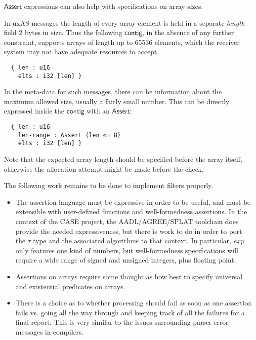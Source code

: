 \documentclass[svgnames]{llncs}
\newcommand{\konst}[1]{\ensuremath{\mathsf{#1}}}
\begin{document}
\noindent \konst{Assert} expressions can also help with specifications
on array sizes.

\begin{example}

In uxAS messages the length of every array element is held in a
separate \emph{length} field 2 bytes in size. Thus the following
\konst{contig}, in the absence of any further constraint, supports arrays of
length up to 65536 elements, which the receiver system may not have
adequate resources to accept.

\begin{verbatim}
  { len : u16
    elts : i32 [len] }
\end{verbatim}

\noindent In the meta-data for such messages, there can be information
about the maximum allowed size, usually a fairly small number. This
can be directly expressed inside the \konst{contig} with an \konst{Assert}:

\begin{verbatim}
  { len : u16
    len-range : Assert (len <= 8)
    elts : i32 [len] }
\end{verbatim}

\noindent Note that the expected array length should be specified
before the array itself, otherwise the allocation attempt might be
made before the check.
\end{example}


\noindent The following work remains to be done to implement filters
properly.

\begin{itemize}

\item The assertion language must be expressive in order to be useful,
  and must be extensible with user-defined functions and
  well-formedness assertions. In the context of the CASE project, the
  AADL/AGREE/SPLAT toolchain does provide the needed expressiveness,
  but there is work to do in order to port the $\tau$ type and the
  associated algorithms to that context. In particular, $\mathit{exp}$
  only features one kind of numbers, but well-formedness
  specifications will require a wide range of signed and unsigned
  integers, plus floating point.

\item Assertions on arrays require some thought as how best to specify
  universal and existential predicates on arrays.

\item There is a choice as to whether processing should fail as soon
  as one assertion fails vs. going all the way through and keeping
  track of all the failures for a final report. This is very similar
  to the issues surrounding parser error messages in compilers.

\end{itemize}
\end{document}
